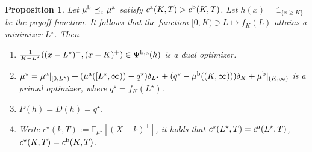 \documentclass[11pt]{article}
\theoremstyle{plain}
\newtheorem{proposition}[theorem]{Proposition}
\theoremstyle{definition}
\theoremstyle{remark}
\newcommand{\E}{\mathbb{E}}
\DeclareMathOperator{\cleq}{\,\preceq_{\rm c}\,}
\theoremstyle{plain}
\begin{document}
\begin{proposition}\label{prop:digital-call-spread}
Let $\mu^{\rm b}\cleq \mu^{\rm a}$ satisfy $c^{\rm a}(K,T)>c^{\rm b}(K,T)$. Let $h(x) = \mathds{1}_{\{x\geq K\}}$ be the payoff function.
It follows that the function $[0,K)\ni L\mapsto f_K(L)$ attains a minimizer $L^\star$. Then
\begin{enumerate}[label = (\roman*)]
    \item $\frac{1}{K-L^\star}((x-L^\star)^+, (x-K)^+) \in \Psi^{\rm b,a}(h)$ is a dual optimizer.
\item $\mu^\star = \mu^{\rm a}|_{[0,L^\star)} + (\mu^{\rm a}([L^\star, \infty)) - q^\star) \delta_{L^\star} + (q^\star - \mu^{\rm b}((K, \infty)) ) \delta_{K} +  \mu^{\rm b}|_{(K,\infty)}$ is a primal optimizer, where $q^\star =  f_K(L^\star)$.
\item $P(h)=D(h)= q^\star$.
\item Write $c^\star(k,T):=\E_{\mu^\star}[(X-k)^+]$, it holds that $c^\star(L^\star,T)=c^{\rm a}(L^\star,T)$, $c^\star(K,T)=c^{\rm b}(K,T)$.
\end{enumerate}
\end{proposition}
\end{document}
